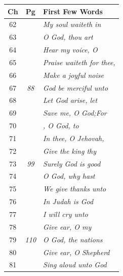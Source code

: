 \documentclass{article}
\newlength{\minipageheight}
\newlength{\minipagewidth}
\begin{document}
%
%
\begin{minipage}[r][\minipageheight][t]{\minipagewidth}%
    \begin{longtable}{ccl}
        \textbf{Ch} & \textbf{Pg}  & \textbf{First Few Words}              \\%
        \hline%
        \endfirsthead%
        62          &              & \textit{My soul waiteth in}           \\
        63          &              & \textit{O God, thou art}              \\
        64          &              & \textit{Hear my voice, O}             \\
        65          &              & \textit{Praise waiteth for thee,}     \\
        66          &              & \textit{Make a joyful noise}          \\
        67          & \textit{88}  & \textit{God be merciful unto}         \\
        68          &              & \textit{Let God arise, let}           \\
        69          &              & \textit{Save me, O God;For}           \\
        70          &              & \textit{, O God, to}                  \\ %
        71          &              & \textit{In thee, O Jehovah,}          \\
        72          &              & \textit{Give the king thy}            \\
        73          & \textit{99}  & \textit{Surely God is good}           \\
        74          &              & \textit{O God, why hast}              \\
        75          &              & \textit{We give thanks unto}          \\
        76          &              & \textit{In Judah is God}              \\
        77          &              & \textit{I will cry unto}              \\
        78          &              & \textit{Give ear, O my}               \\
        79          & \textit{110} & \textit{O God, the nations}           \\
        80          &              & \textit{Give ear, O Shepherd}         \\
        81          &              & \textit{Sing aloud unto God}          \\

\end{longtable}
\end{minipage}
\end{document}
